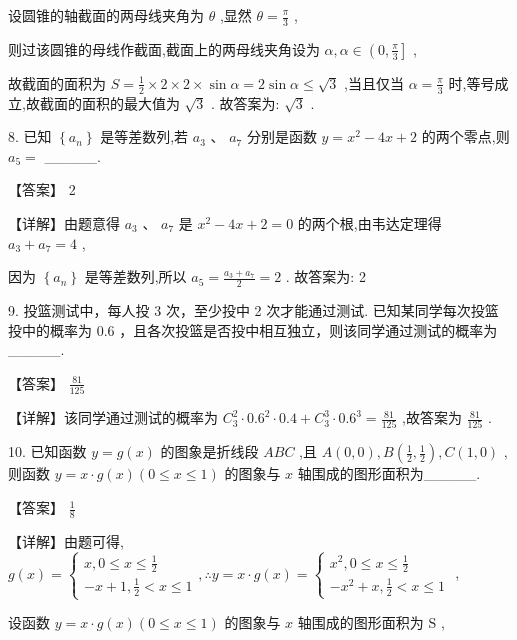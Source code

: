 \documentclass[10pt]{article}
\begin{document}
设圆锥的轴截面的两母线夹角为 \(\theta\) ,显然 \(\theta  = \frac{\pi }{3}\) ,

则过该圆锥的母线作截面,截面上的两母线夹角设为 \(\alpha ,\alpha  \in  \left( {0,\frac{\pi }{3}}\right\rbrack\) ,

故截面的面积为 \(S = \frac{1}{2} \times  2 \times  2 \times  \sin \alpha  = 2\sin \alpha  \leq  \sqrt{3}\) ,当且仅当 \(\alpha  = \frac{\pi }{3}\) 时,等号成立,故截面的面积的最大值为 \(\sqrt{3}\) . 故答案为: \(\sqrt{3}\) .

8. 已知 \(\left\{  {a}_{n}\right\}\) 是等差数列,若 \({a}_{3}\text{ 、 }{a}_{7}\) 分别是函数 \(y = {x}^{2} - {4x} + 2\) 的两个零点,则 \({a}_{5} =\) \_\_\_\_\_.

【答案】 2

【详解】由题意得 \({a}_{3}\text{ 、 }{a}_{7}\) 是 \({x}^{2} - {4x} + 2 = 0\) 的两个根,由韦达定理得 \({a}_{3} + {a}_{7} = 4\) ,

因为 \(\left\{  {a}_{n}\right\}\) 是等差数列,所以 \({a}_{5} = \frac{{a}_{3} + {a}_{7}}{2} = 2\) . 故答案为: 2

9. 投篮测试中，每人投 3 次，至少投中 2 次才能通过测试. 已知某同学每次投篮投中的概率为 0.6 ，且各次投篮是否投中相互独立，则该同学通过测试的概率为\_\_\_\_\_.

【答案】 \(\frac{81}{125}\)

【详解】该同学通过测试的概率为 \({C}_{3}^{2} \cdot  {0.6}^{2} \cdot  {0.4} + {C}_{3}^{3} \cdot  {0.6}^{3} = \frac{81}{125}\) ,故答案为 \(\frac{81}{125}\) .

10. 已知函数 \(y = g\left( x\right)\) 的图象是折线段 \({ABC}\) ,且 \(A\left( {0,0}\right) ,B\left( {\frac{1}{2},\frac{1}{2}}\right) ,C\left( {1,0}\right)\) ,则函数 \(y = x \cdot  g\left( x\right) \left( {0 \leq  x \leq  1}\right)\) 的图象与 \(x\) 轴围成的图形面积为\_\_\_\_\_.

【答案】 \(\frac{1}{8}\)

【详解】由题可得, \(g\left( x\right)  = \left\{  {\begin{array}{l} x,0 \leq  x \leq  \frac{1}{2} \\   - x + 1,\frac{1}{2} < x \leq  1 \end{array},\therefore y = x \cdot  g\left( x\right)  = \left\{  \begin{array}{l} {x}^{2},0 \leq  x \leq  \frac{1}{2} \\   - {x}^{2} + x,\frac{1}{2} < x \leq  1 \end{array}\right. }\right.\) ,

设函数 \(y = x \cdot  g\left( x\right) \left( {0 \leq  x \leq  1}\right)\) 的图象与 \(x\) 轴围成的图形面积为 \(\mathrm{S}\) ,
\end{document}
